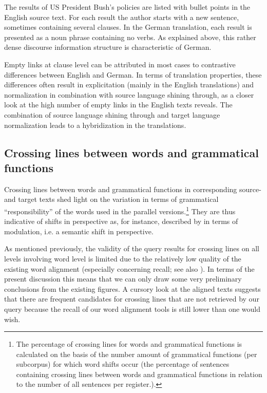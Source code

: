 \documentclass[output=paper]{LSP/langsci}
\begin{document}
The results of US President Bush's policies are listed with bullet points in the English source text. For each result the author starts with a new sentence, sometimes containing several clauses. In the German translation, each result is presented as a noun phrase containing no verbs. As explained above, this rather dense discourse information structure is characteristic of German. 

Empty links at clause level can be attributed in most cases to contrastive differences between English and German. In terms of translation properties, these differences often result in explicitation (mainly in the English translations) and normalization in combination with source language shining through, as a closer look at the high number of empty links in the English texts reveals. The combination of source language shining through and target language normalization leads to a hybridization in the translations.

\subsection{Crossing lines between words and grammatical functions}\label{sec:culo:4.3}

Crossing lines between words and grammatical functions in corresponding source- and target texts shed light on the variation in terms of grammatical ``responsibility'' of the words used in the parallel versions.\footnote{The percentage of crossing lines for words and grammatical functions is calculated on the basis of the number amount of grammatical functions (per subcorpus) for which word shifts occur (the percentage of sentences containing crossing lines between words and grammatical functions in relation to the number of all sentences per register.).} They are thus indicative of shifts in perspective as, for instance, described by \citet{Vinay1958} in terms of modulation, i.e. a semantic shift in perspective. 



As mentioned previously, the validity of the query results for crossing lines on all levels involving word level is limited due to the relatively low quality of the existing word alignment (especially concerning recall; see also 
). In terms of the present discussion this means that we can only draw some very preliminary conclusions from the existing figures. A cursory look at the aligned texts suggests that there are frequent candidates for crossing lines that are not retrieved by our query because the recall of our word alignment tools is still lower than one would wish. 
\end{document}

